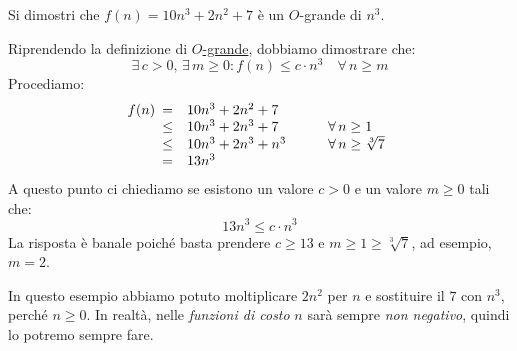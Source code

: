 \begin{eg}
    Si dimostri che $f(n)=10n^3+2n^2+7$ è un $O$-grande di
    $n^3$.

    \bigskip\noindent
    Riprendendo la definizione di \hyperref[def:4]{\emph{$O$}-grande}, dobbiamo
    dimostrare che:
    \[\exists\,c>0,\,\exists\,m\geq0:f(n)\leq c\cdot n^3\quad\forall\,n\geq m\]
    Procediamo:
    \[f(n)\begin{array}[t]{cll}
        =   &   10n^3+2n^2+7    & \\
        \leq&   10n^3+2n^3+7    & \qquad\forall\,n\geq1\\
        \leq&   10n^3+2n^3+n^3  & \qquad\forall\,n\geq\sqrt[3]{7}\\
        =   &   13n^3
    \end{array}\]
    A questo punto ci chiediamo se esistono un valore $c>0$ e un
    valore $m\geq 0$ tali che:
    \[13n^3\leq c\cdot n^3\]
    La risposta è banale poiché basta prendere $c\geq13$ e
    $m\geq1\geq\sqrt[3]{7}$, ad esempio, $m=2$.
\end{eg}
\begin{note}
    In questo esempio abbiamo potuto moltiplicare $2n^2$ per $n$
    e sostituire il $7$ con $n^3$, perché $n\geq0$. In realtà, nelle
    \emph{funzioni di costo} $n$ sarà sempre \emph{non negativo}, quindi lo
    potremo sempre fare.
\end{note}

